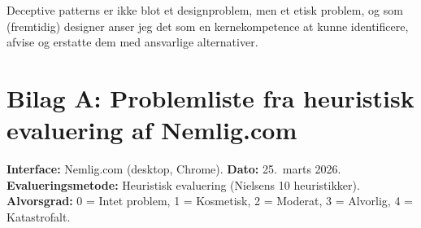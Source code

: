 \documentclass[12pt,a4paper]{article}
\begin{document}
Deceptive patterns er ikke blot et designproblem, men et etisk problem, og
som (fremtidig) designer anser jeg det som en kernekompetence at kunne
identificere, afvise og erstatte dem med ansvarlige alternativer.

\newpage
\appendix
\section*{Bilag A: Problemliste fra heuristisk evaluering af Nemlig.com}

\noindent\textbf{Interface:} Nemlig.com (desktop, Chrome). \textbf{Dato:} 25.\ marts 2026.\\
\textbf{Evalueringsmetode:} Heuristisk evaluering (Nielsens 10 heuristikker).\\
\textbf{Alvorsgrad:} 0 = Intet problem, 1 = Kosmetisk, 2 = Moderat, 3 = Alvorlig,
4 = Katastrofalt.
\end{document}
